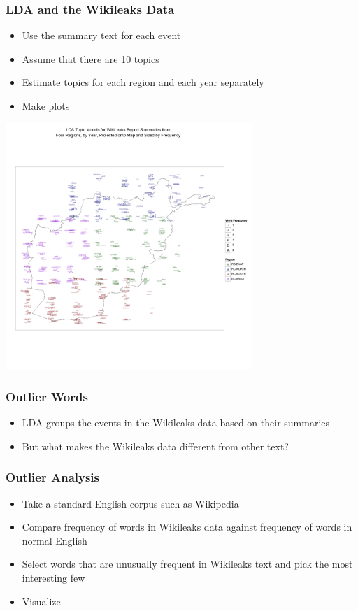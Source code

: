 \documentclass[xcolor=dvipsnames, 9pt]{beamer}
\begin{document}
\begin{frame}[fragile]
  \frametitle{LDA and the Wikileaks Data}
  
  \begin{itemize}
    \item{Use the summary text for each event}
    \item{Assume that there are 10 topics}
    \item{Estimate topics for each region and each year separately}
    \item{Make plots}
  \end{itemize}
\end{frame}

\begin{frame}[fragile]
  \begin{center}
    \includegraphics[width = 0.7\textwidth]{topic_models.png}
  \end{center}
\end{frame}

\begin{frame}
  \frametitle{Outlier Words}
  
  \begin{itemize}
    \item{LDA groups the events in the Wikileaks data based on their summaries}
    \item{But what makes the Wikileaks data different from other text?}
  \end{itemize}
\end{frame}

\begin{frame}[fragile]
  \frametitle{Outlier Analysis}
  
  \begin{itemize}
    \item{Take a standard English corpus such as Wikipedia}
    \item{Compare frequency of words in Wikileaks data against frequency of words in normal English}
    \item{Select words that are unusually frequent in Wikileaks text and pick the most interesting few}
    \item{Visualize}
  \end{itemize}
\end{frame}
\end{document}
